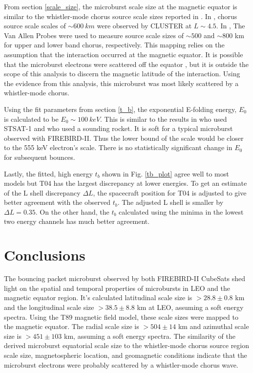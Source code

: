 \documentclass[draft,linenumbers]{agujournal}
\begin{document}
From section \ref{scale_size}, the microburst scale size at the magnetic equator is similar to the whistler-mode chorus source scale sizes reported in \citet{Agapitov11b, Agapitov17a}. In \citet{Agapitov11b}, chorus source scale scales of $\sim 600 \ km$ were observed by CLUSTER at $L \sim 4.5$. In \citet{Agapitov17a}, The Van Allen Probes were used to measure source scale sizes of $\sim 500$ and $\sim 800$ km for upper and lower band chorus, respectively. This mapping relies on the assumption that the interaction occurred at the magnetic equator. It is possible that the microburst electrons were scattered off the equator \citep{Lorentzen01b}, but it is outside the scope of this analysis to discern the magnetic latitude of the interaction. Using the evidence from this analysis, this microburst was most likely scattered by a whistler-mode chorus.

Using the fit parameters from section \ref{t_b}, the exponential E-folding energy, $E_0$ is calculated to be $E_0 \sim 100 \ keV$. This is similar to the results in \citet{Lee05} who used STSAT-1 and \citet{Datta1997} who used a sounding rocket. It is soft for a typical microburst observed with FIREBIRD-II. Thus the lower bound of the scale would be closer to the 555 keV electron's scale. There is no statistically significant change in $E_0$ for subsequent bounces.

Lastly, the fitted, high energy $t_b$ shown in Fig. \ref{tb_plot} agree well to most models but T04 has the largest discrepancy at lower energies. To get an estimate of the L shell discrepancy $\Delta L$, the spacecraft position for T04 is adjusted to give better agreement with the observed $t_b$. The adjusted L shell is smaller by $\Delta L = 0.35$. On the other hand, the $t_b$ calculated using the minima in the lowest two energy channels has much better agreement.

\section{Conclusions}
The bouncing packet microburst observed by both FIREBIRD-II CubeSats shed light on the spatial and temporal properties of microbursts in LEO and the magnetic equator region. It's calculated latitudinal scale size is $ > 28.8 \pm 0.8$ km and the longitudinal scale size $ > 38.5 \pm 8.8$ km at LEO, assuming a soft energy spectra. Using the T89 magnetic field model, these scale sizes were mapped to the magnetic equator. The radial scale size is $> 504 \pm​ 14$ km and azimuthal scale size is $> 451 \pm 103$ km, assuming a soft energy spectra. The similarity of the derived microburst equatorial scale size to the whistler-mode chorus source region scale size, magnetospheric location, and geomagnetic conditions indicate that the microburst electrons were probably scattered by a whistler-mode chorus wave.
\end{document}
